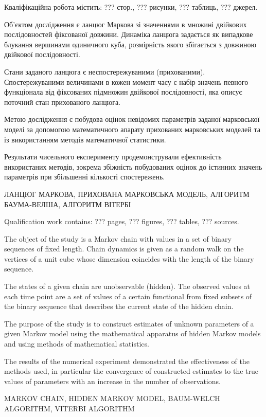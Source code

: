 
\abstractUkr

Кваліфікаційна робота містить: ??? стор., ??? рисунки, ??? таблиць, ??? джерел.

Об'єктом дослідження є ланцюг Маркова зі значеннями в множині двійкових послідовностей фіксованої довжини. Динаміка ланцюга задається як випадкове блукання вершинами одиничного куба, розмірність якого збігається з довжиною двійкової послідовності. 

Стани заданого ланцюга є неспостережуваними (прихованими). Спостережуваними величинами в кожен момент часу є набір значень певного функціонала від фіксованих підмножин двійкової послідовності, яка описує поточний стан прихованого ланцюга.

Метою дослідження є побудова оцінок невідомих параметрів заданої марковської моделі за допомогою математичного апарату прихованих марковських моделей та із використанням методів математичної статистики. 

Результати чисельного експерименту продемонстрували ефективність використаних методів, зокрема збіжність побудованих оцінок до істинних значень параметрів при збільшенні кількості спостережень.

\MakeUppercase{ЛАНЦЮГ МАРКОВА, ПРИХОВАНА МАРКОВСЬКА МОДЕЛЬ, АЛГОРИТМ БАУМА-ВЕЛША, АЛГОРИТМ ВІТЕРБІ}

\abstractEng

Qualification work contains: ??? pages, ??? figures, ??? tables, ??? sources.

The object of the study is a Markov chain with values in a set of binary sequences of fixed length. Chain dynamics is given as a random walk on the vertices of a unit cube whose dimension coincides with the length of the binary sequence.

The states of a given chain are unobservable (hidden). The observed values at each time point are a set of values of a certain functional from fixed subsets of the binary sequence that describes the current state of the hidden chain.

The purpose of the study is to construct estimates of unknown parameters of a given Markov model using the mathematical apparatus of hidden Markov models and using methods of mathematical statistics.

The results of the numerical experiment demonstrated the effectiveness of the methods used, in particular the convergence of constructed estimates to the true values of parameters with an increase in the number of observations.

\MakeUppercase{MARKOV CHAIN, HIDDEN MARKOV MODEL, BAUM-WELCH ALGORITHM, VITERBI ALGORITHM}

\clearpage